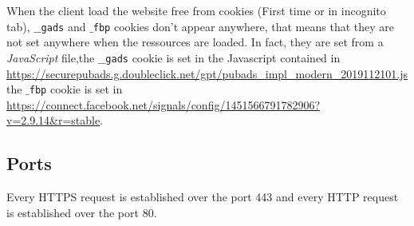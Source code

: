 \documentclass{article}
\begin{document}
When the client load the website free from cookies (First time or in incognito tab), \texttt{$\_\_$gads} and \texttt{$\_$fbp} cookies don't appear anywhere, that means that they are not set anywhere when the ressources are loaded. In fact, they are set from a \textit{JavaScript} file,the \texttt{$\_\_$gads} cookie is set in the Javascript contained in \url{https://securepubads.g.doubleclick.net/gpt/pubads_impl_modern_2019112101.js} the \texttt{$\_$fbp} cookie is set in \url{https://connect.facebook.net/signals/config/1451566791782906?v=2.9.14&r=stable}.

\subsection{Ports}
\label{sub:ports}

Every HTTPS request is established over the port 443 and every HTTP request is established over the port 80.
\end{document}
